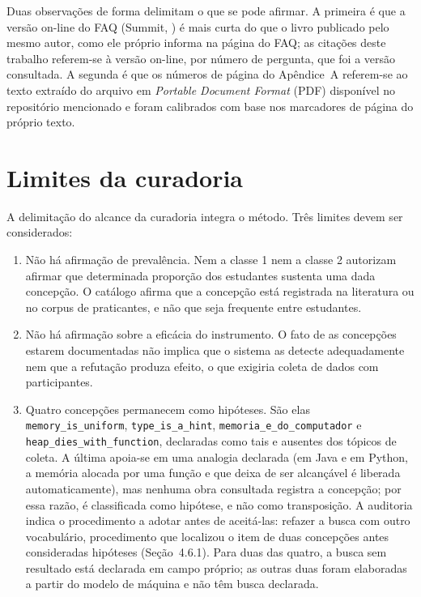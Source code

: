 Duas observações de forma delimitam o que se pode afirmar. A primeira é que a versão on-line do FAQ (Summit, \citeyear{summit2005}) é mais curta do que o livro publicado pelo mesmo autor, como ele próprio informa na página do FAQ; as citações deste trabalho referem-se à versão on-line, por número de pergunta, que foi a versão consultada. A segunda é que os números de página do Apêndice~A referem-se ao texto extraído do arquivo em \textit{Portable Document Format} (PDF) disponível no repositório mencionado e foram calibrados com base nos marcadores de página do próprio texto.

\section{Limites da curadoria}

A delimitação do alcance da curadoria integra o método. Três limites devem ser considerados:

\begin{enumerate}
\item Não há afirmação de prevalência. Nem a classe 1 nem a classe 2 autorizam afirmar que determinada proporção dos estudantes sustenta uma dada concepção. O catálogo afirma que a concepção está registrada na literatura ou no corpus de praticantes, e não que seja frequente entre estudantes.
\item Não há afirmação sobre a eficácia do instrumento. O fato de as concepções estarem documentadas não implica que o sistema as detecte adequadamente nem que a refutação produza efeito, o que exigiria coleta de dados com participantes.
\item Quatro concepções permanecem como hipóteses. São elas \texttt{memory\_\allowbreak{}is\_\allowbreak{}uniform}, \texttt{type\_is\_a\_hint}, \texttt{memoria\_\allowbreak{}e\_\allowbreak{}do\_\allowbreak{}computador} e \texttt{heap\_\allowbreak{}dies\_\allowbreak{}with\_\allowbreak{}function}, declaradas como tais e ausentes dos tópicos de coleta. A última apoia-se em uma analogia declarada (em Java e em Python, a memória alocada por uma função e que deixa de ser alcançável é liberada automaticamente), mas nenhuma obra consultada registra a concepção; por essa razão, é classificada como hipótese, e não como transposição. A auditoria indica o procedimento a adotar antes de aceitá-las: refazer a busca com outro vocabulário, procedimento que localizou o item de duas concepções antes consideradas hipóteses (Seção~4.6.1). Para duas das quatro, a busca sem resultado está declarada em campo próprio; as outras duas foram elaboradas a partir do modelo de máquina e não têm busca declarada.
\end{enumerate}

